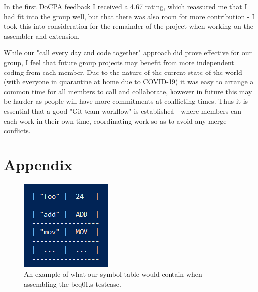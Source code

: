 \documentclass[11pt]{article}
\begin{document}
In the first DoCPA feedback I received a 4.67 rating, which reassured me that I had fit into the group well, but that there was also room for more contribution - I took this into consideration for the remainder of the project when working on the assembler and extension. 

While our "call every day and code together" approach did prove effective for our group, I feel that future group projects may benefit from more independent coding from each member. Due to the nature of the current state of the world (with everyone in quarantine at home due to COVID-19) it was easy to arrange a common time for all members to call and collaborate, however in future this may be harder as people will have more commitments at conflicting times. Thus it is essential that a good "Git team workflow" is established - where members can each work in their own time, coordinating work so as to avoid any merge conflicts.
\newpage
\appendix
\section*{Appendix}

\begin{figure}[ht]
    \centering
    \includegraphics[scale = 0.9]{symbolTable.png}
    \caption{An example of what our symbol table would contain when assembling the beq01.s testcase.}
    \label{fig:symboltable}
\end{figure}
\end{document}
